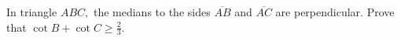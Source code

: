 In triangle $ABC,$ the medians to the sides $\overline{AB}$ and $\overline{AC}$ are perpendicular. Prove that $\cot B+\cot C\ge \frac23.$